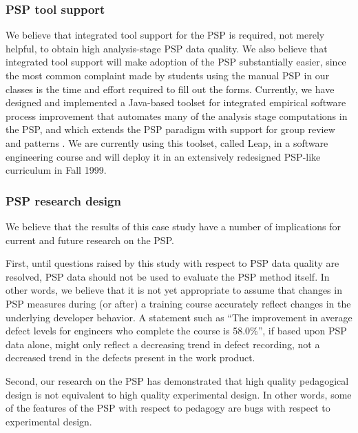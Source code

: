 \subsubsection{PSP tool support}

We believe that integrated tool support for the PSP is required, not
merely helpful, to obtain high analysis-stage PSP data quality.  We also
believe that integrated tool support will make adoption of the PSP
substantially easier, since the most common complaint made by students
using the manual PSP in our classes is the time and effort required to fill
out the forms.  Currently, we have designed and implemented a Java-based
toolset for integrated empirical software process improvement that
automates many of the analysis stage computations in the PSP, and which
extends the PSP paradigm with support for group review and patterns
\cite{Moore98}. We are currently using this toolset, called Leap, in a
software engineering course and will deploy it in an extensively
redesigned PSP-like curriculum in Fall 1999.  

\subsubsection{PSP research design}

We believe that the results of this case study have a number of
implications for current and future research on the PSP.

First, until questions raised by this study with respect to PSP data
quality are resolved, PSP data should not be used to evaluate the PSP
method itself. In other words, we believe that it is not yet appropriate to
assume that changes in PSP measures during (or after) a training course
accurately reflect changes in the underlying developer behavior.  A
statement such as ``The improvement in average defect levels for engineers
who complete the course is 58.0\%'', if based upon PSP data alone, might
only reflect a decreasing trend in defect recording, not a decreased trend
in the defects present in the work product.

Second, our research on the PSP has demonstrated that high quality pedagogical
design is not equivalent to high quality experimental design.  In other
words, some of the features of the PSP with respect to pedagogy are bugs
with respect to experimental design. 

